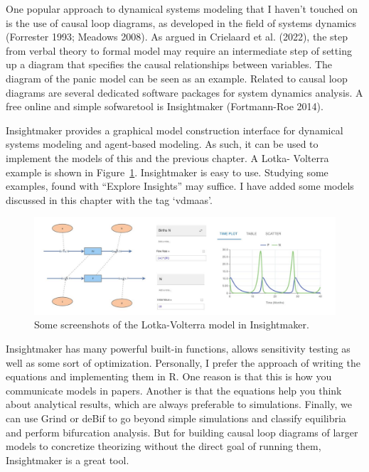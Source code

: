 \documentclass[
  letterpaper,
]{scrbook}
\begin{document}
One popular approach to dynamical systems modeling that I haven't
touched on is the use of causal loop diagrams, as developed in the field
of systems dynamics (Forrester 1993; Meadows 2008). As argued in
Crielaard et al. (2022), the step from verbal theory to formal model may
require an intermediate step of setting up a diagram that specifies the
causal relationships between variables. The diagram of the panic model
can be seen as an example. Related to causal loop diagrams are several
dedicated software packages for system dynamics analysis. A free online
and simple sofwaretool is Insightmaker (Fortmann-Roe 2014).

Insightmaker provides a graphical model construction interface for
dynamical systems modeling and agent-based modeling. As such, it can be
used to implement the models of this and the previous chapter. A Lotka-
Volterra example is shown in Figure~\ref{fig-ch5-img21-old-69}.
Insightmaker is easy to use. Studying some examples, found with
``Explore Insights'' may suffice. I have added some models discussed in
this chapter with the tag `vdmaas'.

\begin{figure}

{\centering \includegraphics[width=6.26389in,height=\textheight]{media/ch5/image21.jpg}

}

\caption{\label{fig-ch5-img21-old-69}Some screenshots of the
Lotka-Volterra model in Insightmaker.}

\end{figure}

Insightmaker has many powerful built-in functions, allows sensitivity
testing as well as some sort of optimization. Personally, I prefer the
approach of writing the equations and implementing them in R. One reason
is that this is how you communicate models in papers. Another is that
the equations help you think about analytical results, which are always
preferable to simulations. Finally, we can use Grind or deBif to go
beyond simple simulations and classify equilibria and perform
bifurcation analysis. But for building causal loop diagrams of larger
models to concretize theorizing without the direct goal of running them,
Insightmaker is a great tool.
\end{document}

